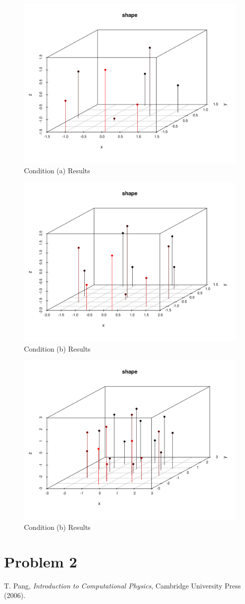 \documentclass[prb,twocolumn]{revtex4-2}
\begin{document}
\begin{figure}[H]
    \centerline{\includegraphics [width=3 in] {img/cube.png}}
    \caption{Condition (a) Results} \label{q1}
\end{figure}

\begin{figure}[H]
    \centerline{\includegraphics [width=3 in] {img/icosa.png}}
    \caption{Condition (b) Results} \label{q1}
\end{figure}

\begin{figure}[H]
    \centerline{\includegraphics [width=3 in] {img/dodeca.png}}
    \caption{Condition (b) Results} \label{q1}
\end{figure}


\section{Problem 2}
\begin{thebibliography}{99}

 T. Pang, \emph{Introduction to Computational Physics},
    Cambridge University Press (2006).

\end{thebibliography}
\end{document}
